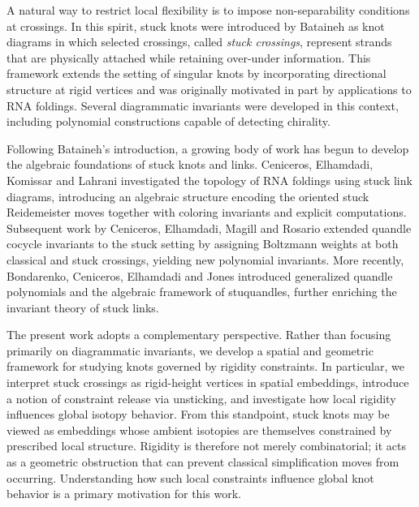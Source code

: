 \documentclass[11pt,a4paper]{article}
\theoremstyle{plain}
\theoremstyle{definition}
\begin{document}
A natural way to restrict local flexibility is to impose non-separability conditions at crossings. In this spirit, stuck knots were introduced by Bataineh \cite{Bataineh2020} as knot diagrams in which selected crossings, called {\it stuck crossings}, represent strands that are physically attached while retaining over-under information. This framework extends the setting of singular knots by incorporating directional structure at rigid vertices and was originally motivated in part by applications to RNA foldings. Several diagrammatic invariants were developed in this context, including polynomial constructions capable of detecting chirality.

Following Bataineh’s introduction, a growing body of work has begun to develop the algebraic foundations of stuck knots and links. Ceniceros, Elhamdadi, Komissar and Lahrani \cite{CenicerosElhamdadiKomissarLahrani2024} investigated the topology of RNA foldings using stuck link diagrams, introducing an algebraic structure encoding the oriented stuck Reidemeister moves together with coloring invariants and explicit computations. Subsequent work by Ceniceros, Elhamdadi, Magill and Rosario \cite{CenicerosElhamdadiMagillRosario2023} extended quandle cocycle invariants to the stuck setting by assigning Boltzmann weights at both classical and stuck crossings, yielding new polynomial invariants. More recently, Bondarenko, Ceniceros, Elhamdadi and Jones \cite{BondarenkoCenicerosElhamdadiJones2025} introduced generalized quandle polynomials and the algebraic framework of stuquandles, further enriching the invariant theory of stuck links.

\smallbreak 

The present work adopts a complementary perspective. Rather than focusing primarily on diagrammatic invariants, we develop a spatial and geometric framework for studying knots governed by rigidity constraints. In particular, we interpret stuck crossings as rigid-height vertices in spatial embeddings, introduce a notion of constraint release via unsticking, and investigate how local rigidity influences global isotopy behavior. From this standpoint, stuck knots may be viewed as embeddings whose ambient isotopies are themselves constrained by prescribed local structure. Rigidity is therefore not merely combinatorial; it acts as a geometric obstruction that can prevent classical simplification moves from occurring. Understanding how such local constraints influence global knot behavior is a primary motivation for this work.
\end{document}
